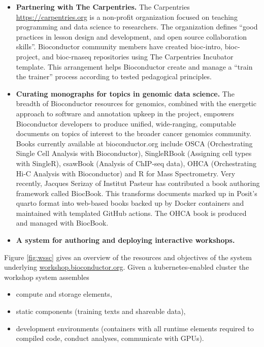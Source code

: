 \begin{itemize}
\item
  \textbf{Partnering with The Carpentries.} The Carpentries \url{https://carpentries.org} is a non-profit organization focused on teaching programming
  and data science to researchers. The organization defines ``good
  practices in lesson design and development, and open source
  collaboration skills''. Bioconductor community members have
  created bioc-intro, bioc-project, and bioc-rnaseq repositories
  using The Carpentries Incubator template. This arrangement helps
  Bioconductor create and manage a ``train the trainer'' process
  according to tested pedagogical principles.
\item
  \textbf{Curating monographs for topics in genomic data science.} The
  breadth of Bioconductor resources for genomics, combined with the
  energetic approach to software and annotation upkeep in the project,
  empowers Bioconductor developers to produce unified, wide-ranging,
  computable documents on topics of interest to the broader
  cancer genomics community. Books currently available
  at bioconductor.org include OSCA (Orchestrating Single Cell Analysis
  with Bioconductor), SingleRBook (Assigning cell types with SingleR),
  csawBook (Analysis of ChIP-seq data), OHCA (Orchestrating Hi-C
  Analysis with Bioconductor) and R for Mass Spectrometry. Very
  recently, Jacques Serizay of Institut Pasteur has contributed
  a book authoring framework called BiocBook. This transforms documents
  marked up in Posit's quarto format into web-based books backed up by Docker
  containers and maintained with templated GitHub actions. The
  OHCA book is produced and managed with BiocBook.
\item
  \textbf{A system for authoring and deploying interactive workshops.}
\end{itemize}

Figure \ref{fig:wssc} gives an overview of the resources and
objectives of the system underlying \url{workshop.bioconductor.org}.
Given a kubernetes-enabled cluster
the workshop system assembles

\begin{itemize}
\tightlist
\item
  compute and storage elements,
\item
  static components (training texts and shareable data),
\item
  development environments (containers with all runtime elements
  required to compiled code, conduct analyses, communicate with GPUs).
\end{itemize}

